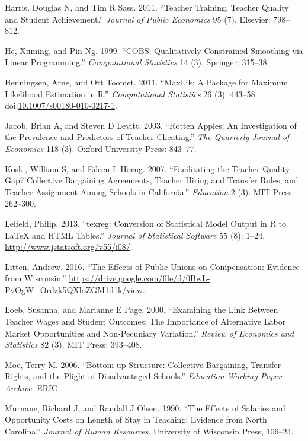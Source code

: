 \documentclass[12pt,]{article}
\begin{document}
\hypertarget{ref-harris}{}
Harris, Douglas N, and Tim R Sass. 2011. ``Teacher Training, Teacher
Quality and Student Achievement.'' \emph{Journal of Public Economics} 95
(7). Elsevier: 798--812.

\hypertarget{ref-he}{}
He, Xuming, and Pin Ng. 1999. ``COBS: Qualitatively Constrained
Smoothing via Linear Programming.'' \emph{Computational Statistics} 14
(3). Springer: 315--38.

\hypertarget{ref-henningsen}{}
Henningsen, Arne, and Ott Toomet. 2011. ``MaxLik: A Package for Maximum
Likelihood Estimation in R.'' \emph{Computational Statistics} 26 (3):
443--58.
doi:\href{https://doi.org/10.1007/s00180-010-0217-1}{10.1007/s00180-010-0217-1}.

\hypertarget{ref-jacob}{}
Jacob, Brian A, and Steven D Levitt. 2003. ``Rotten Apples: An
Investigation of the Prevalence and Predictors of Teacher Cheating.''
\emph{The Quarterly Journal of Economics} 118 (3). Oxford University
Press: 843--77.

\hypertarget{ref-koski}{}
Koski, William S, and Eileen L Horng. 2007. ``Facilitating the Teacher
Quality Gap? Collective Bargaining Agreements, Teacher Hiring and
Transfer Rules, and Teacher Assignment Among Schools in California.''
\emph{Education} 2 (3). MIT Press: 262--300.

\hypertarget{ref-leifeld}{}
Leifeld, Philip. 2013. ``texreg: Conversion of Statistical Model Output
in R to LaTeX and HTML Tables.'' \emph{Journal of Statistical Software}
55 (8): 1--24. \url{http://www.jstatsoft.org/v55/i08/}.

\hypertarget{ref-litten}{}
Litten, Andrew. 2016. ``The Effects of Public Unions on Compensation:
Evidence from Wisconsin.''
\url{https://drive.google.com/file/d/0BwL-PvOgW_Ordzk5QXloZGM1d1k/view}.

\hypertarget{ref-loeb}{}
Loeb, Susanna, and Marianne E Page. 2000. ``Examining the Link Between
Teacher Wages and Student Outcomes: The Importance of Alternative Labor
Market Opportunities and Non-Pecuniary Variation.'' \emph{Review of
Economics and Statistics} 82 (3). MIT Press: 393--408.

\hypertarget{ref-moe}{}
Moe, Terry M. 2006. ``Bottom-up Structure: Collective Bargaining,
Transfer Rights, and the Plight of Disadvantaged Schools.''
\emph{Education Working Paper Archive}. ERIC.

\hypertarget{ref-murnane}{}
Murnane, Richard J, and Randall J Olsen. 1990. ``The Effects of Salaries
and Opportunity Costs on Length of Stay in Teaching: Evidence from North
Carolina.'' \emph{Journal of Human Resources}. University of Wisconsin
Press, 106--24.
\end{document}
